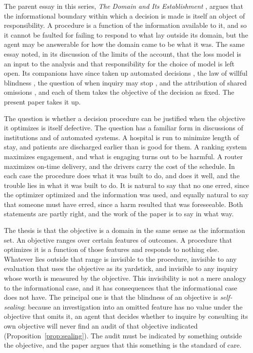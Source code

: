 \documentclass[11pt]{article}
\theoremstyle{plain}
\theoremstyle{definition}
\begin{document}
The parent essay in this series, \emph{The Domain and Its Establishment} \cite{flyxion2026domain}, argues that the informational boundary within which a decision is made is itself an object of responsibility. A procedure is a function of the information available to it, and so it cannot be faulted for failing to respond to what lay outside its domain, but the agent may be answerable for how the domain came to be what it was. The same essay noted, in its discussion of the limits of the account, that the loss model is an input to the analysis and that responsibility for the choice of model is left open. Its companions have since taken up automated decisions \cite{flyxion2026inputs}, the law of willful blindness \cite{flyxion2026law}, the question of when inquiry may stop \cite{flyxion2026stop}, and the attribution of shared omissions \cite{flyxion2026shared}, and each of them takes the objective of the decision as fixed. The present paper takes it up.

The question is whether a decision procedure can be justified when the objective it optimizes is itself defective. The question has a familiar form in discussions of institutions and of automated systems. A hospital is run to minimize length of stay, and patients are discharged earlier than is good for them. A ranking system maximizes engagement, and what is engaging turns out to be harmful. A router maximizes on-time delivery, and the drivers carry the cost of the schedule. In each case the procedure does what it was built to do, and does it well, and the trouble lies in what it was built to do. It is natural to say that no one erred, since the optimizer optimized and the information was used, and equally natural to say that someone must have erred, since a harm resulted that was foreseeable. Both statements are partly right, and the work of the paper is to say in what way.

The thesis is that the objective is a domain in the same sense as the information set. An objective ranges over certain features of outcomes. A procedure that optimizes it is a function of those features and responds to nothing else. Whatever lies outside that range is invisible to the procedure, invisible to any evaluation that uses the objective as its yardstick, and invisible to any inquiry whose worth is measured by the objective. This invisibility is not a mere analogy to the informational case, and it has consequences that the informational case does not have. The principal one is that the blindness of an objective is \emph{self-sealing}: because an investigation into an omitted feature has no value under the objective that omits it, an agent that decides whether to inquire by consulting its own objective will never find an audit of that objective indicated (Proposition~\ref{prop:sealing}). The audit must be indicated by something outside the objective, and the paper argues that this something is the standard of care.
\end{document}
